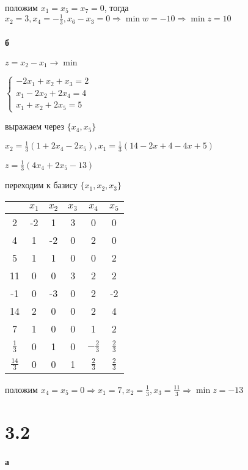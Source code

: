 \documentclass[russian]{article}
\begin{document}
положим $x_1=x_5 = x_7 =0$, тогда $x_2 = 3, x_4 = - \frac{1}{3}, x_6 - x_3 = 0 \Rightarrow \min w = -10 \Rightarrow \min z = 10$

\paragraph{б}

$z = x_2 - x_1 \to \min$

$\begin{cases}
-2 x_1 + x_2 + x_3 = 2 \\
x_1 - 2x_2 + 2 x_4 = 4 \\
x_1 + x_2 + 2 x_5 = 5
\end{cases}$

выражаем через $\{x_4, x_5\}$

$ x_2 = \frac{1}{3}(1  + 2 x_4 - 2 x_5) , x_1 = \frac{1}{3}(14 - 2 x+4 - 4 x+5)$

$z = \frac{1}{3}(4 x_4 + 2 x_5 - 13)$

переходим к базису $\{ x_1, x_2, x_3\}$

\begin{tabular}{|c|ccccc|}\hline
& $x_1$ & $x_2$ & $x_3$ & $x_4$ & $x_5$ \\\hline

2 & -2 & 1 & 3 & 0 & 0 \\
4 & 1 & -2 & 0 & 2 & 0 \\
5 & 1 & 1 & 0 & 0 & 2 \\\hline

11 & 0 & 0 & 3 & 2 & 2 \\
-1 & 0 & -3 & 0 & 2 & -2 \\
14 & 2 & 0 & 0 & 2 & 4  \\\hline

7 & 1 & 0 & 0 & 1 & 2 \\
$\frac{1}{3}$ & 0 & 1 & 0 & $-\frac{2}{3}$ & $\frac{2}{3}$ \\
$\frac{14}{3}$ & 0 & 0 & 1 & $\frac{2}{3}$ & $\frac{2}{3}$ \\\hline

\end{tabular}

положим $x_4=x_5 = 0 \Rightarrow x_1 = 7, x_2 = \frac{1}{3},x_3 = \frac{11}{3} \Rightarrow \min z = -13$

\section*{3.2}

\paragraph{а}
\end{document}

